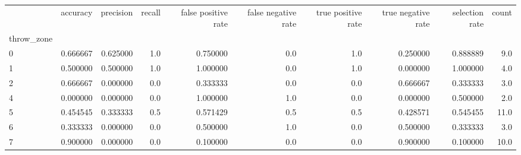 \begin{tabular}{lrrrrrrrrr}
\toprule
{} &  accuracy &  precision &  recall &  false positive rate &  false negative rate &  true positive rate &  true negative rate &  selection rate &  count \\
throw\_zone &           &            &         &                      &                      &                     &                     &                 &        \\
\midrule
0          &  0.666667 &   0.625000 &     1.0 &             0.750000 &                  0.0 &                 1.0 &            0.250000 &        0.888889 &    9.0 \\
1          &  0.500000 &   0.500000 &     1.0 &             1.000000 &                  0.0 &                 1.0 &            0.000000 &        1.000000 &    4.0 \\
2          &  0.666667 &   0.000000 &     0.0 &             0.333333 &                  0.0 &                 0.0 &            0.666667 &        0.333333 &    3.0 \\
4          &  0.000000 &   0.000000 &     0.0 &             1.000000 &                  1.0 &                 0.0 &            0.000000 &        0.500000 &    2.0 \\
5          &  0.454545 &   0.333333 &     0.5 &             0.571429 &                  0.5 &                 0.5 &            0.428571 &        0.545455 &   11.0 \\
6          &  0.333333 &   0.000000 &     0.0 &             0.500000 &                  1.0 &                 0.0 &            0.500000 &        0.333333 &    3.0 \\
7          &  0.900000 &   0.000000 &     0.0 &             0.100000 &                  0.0 &                 0.0 &            0.900000 &        0.100000 &   10.0 \\
\bottomrule
\end{tabular}

